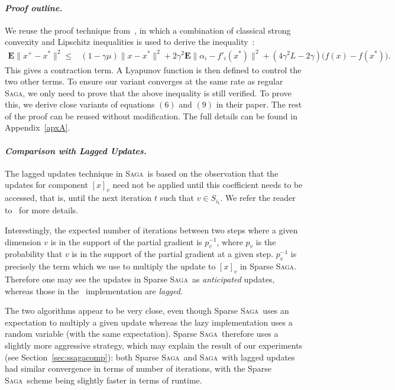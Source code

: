 \documentclass[twoside, 11pt]{article}
\newcommand{\stepsize}{\gamma}
\newcommand{\strongconvex}{\mu}
\newcommand{\lipschitz}{L}
\newcommand{\Econd}{\mathbf{E}}
\newcommand{\SAGA}{\textsc{Saga}}
\begin{document}
\paragraph{\textit{Proof outline.}}\label{sparseoutline}
We reuse the proof technique from~\citet{qsaga}, in which a combination of classical strong convexity and Lipschitz inequalities is used to derive the inequality~\citep[Lemma~1]{qsaga}:
\begin{align}\label{eq:sparse}
\Econd \|x^{+} \! - \!x^*\|^2 \leq
&(1 \! - \! \stepsize\strongconvex) \|x \! -\! x^*\|^2
+ 2\stepsize^2 \Econd \|\alpha_i - f'_i(x^*)\|^2
+ (4 \stepsize^2 \lipschitz-2\stepsize)\big(f(x) - f(x^*)\big).
\end{align}
This gives a contraction term.
A Lyapunov function is then defined to control the two other terms.
To ensure our variant converges at the same rate as regular \SAGA, we only need to prove that the above inequality \citep[Lemma~1]{qsaga} is still verified.
To prove this, we derive close variants of equations $(6)$ and $(9)$ in their paper.
The rest of the proof can be reused without modification.
The full details can be found in Appendix~\ref{apxA}.

\paragraph{\textit{Comparison with Lagged Updates.}}
The lagged updates technique in \SAGA\ is based on the observation that the updates for component $[x]_v$ need not be applied until this coefficient needs to be accessed, that is, until the next iteration $t$ such that $ v \in S_{i_t}$.
We refer the reader to~\citet{laggedsaga} for more details.

Interestingly, the expected number of iterations between two steps where a given dimension $v$ is in the support of the partial gradient is $p_v^{-1}$, where $p_v$ is the probability that $v$ is in the support of the partial gradient at a given step.
$p_v^{-1}$ is precisely the term which we use to multiply the update to $[x]_v$ in Sparse \SAGA.
Therefore one may see the updates in Sparse \SAGA\ as \textit{anticipated} updates, whereas those in the~\citet{laggedsaga} implementation are \textit{lagged}.

The two algorithms appear to be very close, even though Sparse \SAGA\ uses an expectation to multiply a given update whereas the lazy implementation uses a random variable (with the same expectation). Sparse \SAGA\ therefore uses a slightly more aggressive strategy, which may explain the result of our experiments (see Section~\ref{sec:ssagacomp}): both Sparse \SAGA\ and \SAGA\ with lagged updates had similar convergence in terms of number of iterations, with the Sparse \SAGA\ scheme being slightly faster in terms of runtime.
\end{document}
